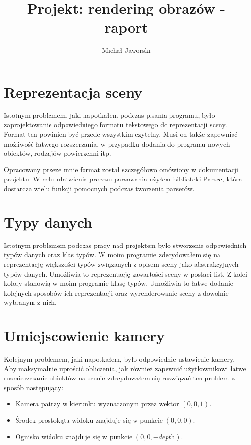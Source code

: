 \documentclass[11pt,a4paper]{article}
\title{\vspace{-2.0cm}\textbf{Projekt: rendering obrazów - raport}}
\author{Michał Jaworski}
\begin{document}
\maketitle
\section{Reprezentacja sceny}
Istotnym problemem, jaki napotkałem podczas pisania programu, było zaprojektowanie odpowiedniego formatu tekstowego do reprezentacji sceny. Format ten powinien być przede wszystkim czytelny. Musi on także zapewniać możliwość łatwego rozszerzania, w przypadku dodania do programu nowych obiektów, rodzajów powierzchni itp.

Opracowany przeze mnie format został szczegółowo omówiony w dokumentacji projektu. W celu ułatwienia procesu parsowania użyłem biblioteki Parsec, która dostarcza wielu funkcji pomocnych podczas tworzenia parserów.
\section{Typy danych}
Istotnym problemem podczas pracy nad projektem było stworzenie odpowiednich typów danych oraz klas typów. W moim programie zdecydowałem się na reprezentację większości typów związanych z opisem sceny jako abstrakcyjnych typów danych. Umożliwia to reprezentację zawartości sceny w postaci list. Z kolei kolory stanowią w moim programie klasę typów. Umożliwia to łatwe dodanie kolejnych sposobów ich reprezentacji oraz wyrenderowanie sceny z dowolnie wybranym z nich.
\section{Umiejscowienie kamery}
Kolejnym problemem, jaki napotkałem, było odpowiednie ustawienie kamery. Aby maksymalnie uprościć obliczenia, jak również zapewnić użytkownikowi łatwe rozmieszczanie obiektów na scenie zdecydowałem się rozwiązać ten problem w sposób następujący:
\begin{itemize}
\item Kamera patrzy w kierunku wyznaczonym przez wektor $(0, 0, 1)$.
\item Środek prostokąta widoku znajduje się w punkcie $(0, 0, 0)$.
\item Ognisko widoku znajduje się w punkcie $(0, 0, -\textit{depth})$.
\end{itemize}
\end{document}
